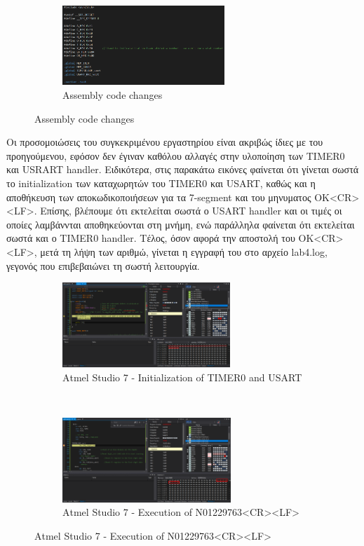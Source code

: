 \documentclass{article}
\begin{document}
\begin{figure}[h!]
		\begin{subfigure}[t]{0.5\textwidth}
			\centering
			\includegraphics[height=3cm, width=\linewidth]{./results/lab4_assembly_changes.png}
			\caption{Assembly code changes}
		\end{subfigure}	
	\end{figure}
	
	\noindent
	Οι προσομοιώσεις του συγκεκριμένου εργαστηρίου είναι ακριβώς ίδιες με του προηγούμενου, εφόσον δεν έγιναν καθόλου αλλαγές στην υλοποίηση των TIMER0 και USRART handler. Eιδικότερα, στις παρακάτω εικόνες φαίνεται ότι γίνεται σωστά το initialization των καταχωρητών του TIMER0 και USART, καθώς και η αποθήκευση των αποκωδικοποιήσεων για τα 7-segment και του μηνυματος OK<CR><LF>. Eπίσης, βλέπουμε ότι εκτελείται σωστά ο USART handler και οι τιμές οι οποίες λαμβάννται αποθηκεύονται στη μνήμη, ενώ παράλληλα φαίνεται ότι εκτελείται σωστά και ο TIMER0 handler. Tέλος, όσον αφορά την αποστολή του OK<CR><LF>, μετά τη λήψη των αριθμώ, γίνεται η εγγραφή του στο αρχείο lab4.log, γεγονός που επιβεβαιώνει τη σωστή λειτουργία.\\
	
	\begin{figure}[h!]
		\centering
		\begin{subfigure}[t]{0.5\textwidth}
			\centering
			\includegraphics[height=3.2cm, width=\linewidth]{./results/lab4_sim_init.png}
			\caption{Αtmel Studio 7 - Initialization of TIMER0 and USART}
		\end{subfigure}%
		~
		\begin{subfigure}[t]{0.5\textwidth}
			\centering
			\includegraphics[height=3.2cm, width=\linewidth]{./results/lab4_sim_num.png}
			\caption{Αtmel Studio 7 - Execution of N01229763<CR><LF>}
		\end{subfigure}
	\end{figure}
\end{document}
